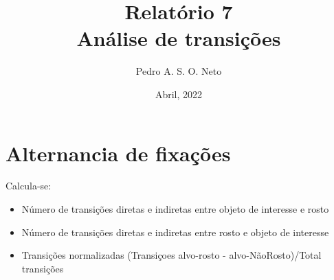 \documentclass{article}
\title{Relatório 7 \\ Análise de transições}
\author{Pedro A. S. O. Neto}
\date{Abril, 2022}
\begin{document}
\maketitle

\section{Alternancia de fixações}

Calcula-se:

\begin{itemize}
  \item Número de transições diretas e indiretas entre objeto de interesse e rosto
  \item Número de transições diretas e indiretas entre rosto e objeto de interesse 
  \item Transições normalizadas (Transiçoes alvo-rosto - alvo-NãoRosto)/Total transições
\end{itemize}

\end{document}
